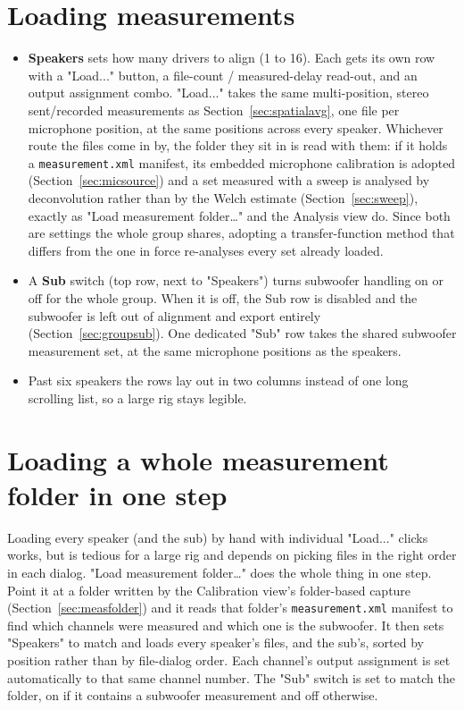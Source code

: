 \section{Loading measurements}
\begin{itemize}[nosep]
  \item \textbf{Speakers} sets how many drivers to align (1 to 16). Each gets its own row with a "Load..." button, a file-count / measured-delay read-out, and an output assignment combo. "Load..." takes the same multi-position, stereo sent/recorded measurements as Section~\ref{sec:spatialavg}, one file per microphone position, at the same positions across every speaker. Whichever route the files come in by, the folder they sit in is read with them: if it holds a \texttt{measurement.xml} manifest, its embedded microphone calibration is adopted (Section~\ref{sec:micsource}) and a set measured with a sweep is analysed by deconvolution rather than by the Welch estimate (Section~\ref{sec:sweep}), exactly as "Load measurement folder\ldots" and the Analysis view do. Since both are settings the whole group shares, adopting a transfer-function method that differs from the one in force re-analyses every set already loaded.
  \item A \textbf{Sub} switch (top row, next to "Speakers") turns subwoofer handling on or off for the whole group. When it is off, the Sub row is disabled and the subwoofer is left out of alignment and export entirely (Section~\ref{sec:groupsub}). One dedicated "Sub" row takes the shared subwoofer measurement set, at the same microphone positions as the speakers.
  \item Past six speakers the rows lay out in two columns instead of one long scrolling list, so a large rig stays legible.
\end{itemize}

\section{Loading a whole measurement folder in one step}\label{sec:grouploadfolder}
Loading every speaker (and the sub) by hand with individual "Load..." clicks works, but is tedious for a large rig and depends on picking files in the right order in each dialog. "Load measurement folder\ldots" does the whole thing in one step. Point it at a folder written by the Calibration view's folder-based capture (Section~\ref{sec:measfolder}) and it reads that folder's \texttt{measurement.xml} manifest to find which channels were measured and which one is the subwoofer. It then sets "Speakers" to match and loads every speaker's files, and the sub's, sorted by position rather than by file-dialog order. Each channel's output assignment is set automatically to that same channel number. The "Sub" switch is set to match the folder, on if it contains a subwoofer measurement and off otherwise.

